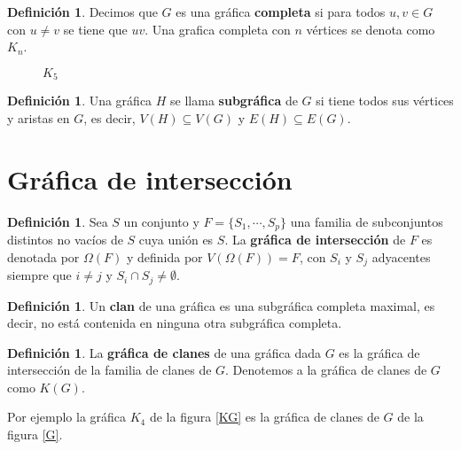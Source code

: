 \documentclass[12pt]{book}
\theoremstyle{definition}
\newtheorem{definition}[theorem]{Definición}
\newcounter{in}
\newcounter{ini}
\begin{document}
\begin{definition}
  Decimos que $G$ es una gráfica \textbf{completa} si para todos
  $u,v\in G$ con $u\neq v$ se tiene que $uv$. Una grafica completa con
  $n$ vértices se denota como $K_{n}$.
\end{definition}

\begin{figure}[h]
  \centering
  
  \caption{$K_{5}$}
\label{fig:K5}
\end{figure}

\begin{definition}
  Una gráfica $H$ se llama \textbf{subgráfica} de $G$ si tiene todos
  sus vértices y aristas en $G$, es decir, $V(H)\subseteq V (G)$ y
  $E(H)\subseteq E(G)$. 
\end{definition}

\section{Gráfica de intersección}

\begin{definition}
  Sea $S$ un conjunto y $F=\{S_{1},\cdots,S_{p}\}$ una familia de
  subconjuntos distintos no vacíos de $S$ cuya unión es $S$. La
  \textbf{gráfica de intersección} de $F$ es denotada por $\Omega(F)$
  y definida por $V(\Omega(F))=F$, con $S_{i}$ y $S_{j}$ adyacentes
  siempre que $i\neq j$ y $S_{i}\cap S_{j}\neq\emptyset$.
\end{definition}

\begin{definition}
  Un \textbf{clan} de una gráfica es una subgráfica completa
  maximal, es decir, no está contenida en ninguna otra subgráfica completa.
\end{definition}

\begin{definition}
  La \textbf{gráfica de clanes} de una gráfica dada $G$ es la gráfica
  de intersección de la familia de clanes de $G$. Denotemos a la
  gráfica de clanes de $G$ como $K(G)$. 
\end{definition}
Por ejemplo la gráfica $K_{4}$ de la figura \ref{KG} es la gráfica de
clanes de $G$ de la figura \ref{G}.
\end{document}
